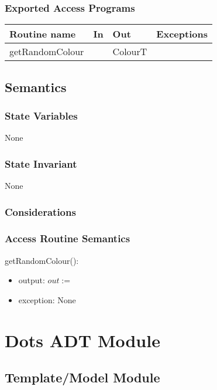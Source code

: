 \documentclass[12pt]{article}
\begin{document}
\subsubsection* {Exported Access Programs}

\begin{tabular}{| l | l | l | l |}
\hline
\textbf{Routine name} & \textbf{In} & \textbf{Out} & \textbf{Exceptions}\\
\hline
getRandomColour & ~ & ColourT & \\
\hline
\end{tabular}

\subsection* {Semantics}

\subsubsection* {State Variables}

None

\subsubsection* {State Invariant}

None

\subsubsection* {Considerations}

\newpage

\subsubsection* {Access Routine Semantics}

getRandomColour():
\begin{itemize}
\item output: $out := $
\item exception: None
\end{itemize}


\newpage

\section* {Dots ADT Module}

\subsection*{Template/Model Module}
\end{document}
